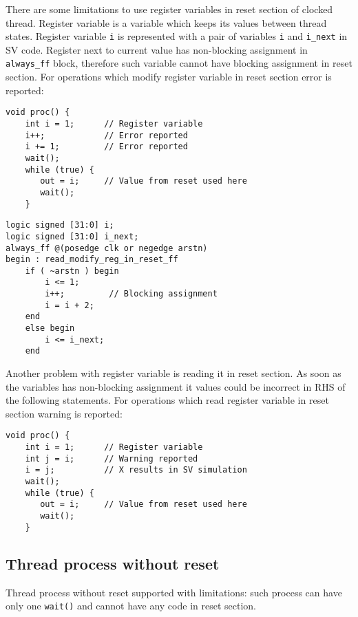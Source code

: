 There are some limitations to use register variables in reset section of clocked thread. Register variable is a variable which keeps its values between thread states. Register variable {\tt i} is represented with a pair of variables {\tt i} and {\tt i\_next} in SV code. Register next to current value has non-blocking assignment in {\tt always\_ff} block, therefore such variable cannot have blocking assignment in reset section. For operations which modify register variable in reset section error is reported:
%
\begin{lstlisting}[style=mycpp]
void proc() {
    int i = 1;      // Register variable
    i++;            // Error reported
    i += 1;         // Error reported
    wait();
    while (true) {
       out = i;     // Value from reset used here
       wait();
    }        
\end{lstlisting}

\begin{lstlisting}[style=myverilog]
logic signed [31:0] i;
logic signed [31:0] i_next;
always_ff @(posedge clk or negedge arstn) 
begin : read_modify_reg_in_reset_ff
    if ( ~arstn ) begin
        i <= 1;
        i++;         // Blocking assignment
        i = i + 2;   
    end
    else begin
        i <= i_next;
    end
\end{lstlisting}

Another problem with register variable is reading it in reset section. As soon as the variables has non-blocking assignment it values could be incorrect in RHS of the following statements. For operations which read register variable in reset section warning is reported:
%
\begin{lstlisting}[style=mycpp]
void proc() {
    int i = 1;      // Register variable
    int j = i;      // Warning reported
    i = j;          // X results in SV simulation
    wait();
    while (true) {
       out = i;     // Value from reset used here
       wait();
    }        
\end{lstlisting}

\subsection{Thread process without reset}\label{section:noreset}

Thread process without reset supported with limitations: such process can have only one {\tt wait()} and cannot have any code in reset section.

